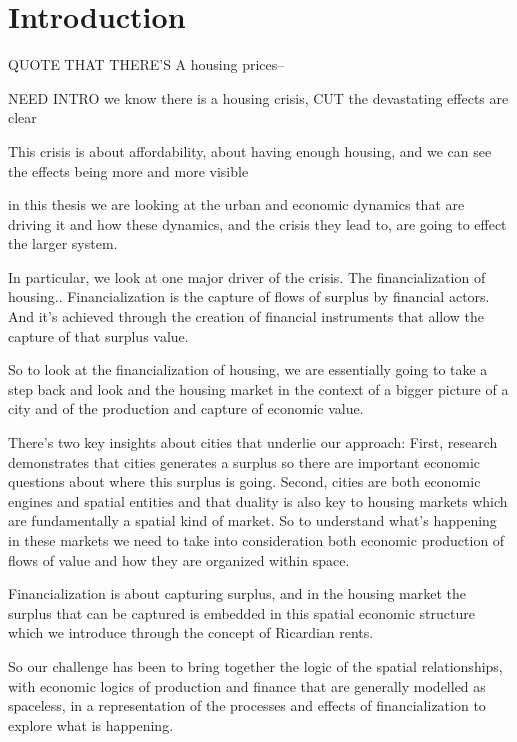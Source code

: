 
\section{Introduction}
QUOTE THAT THERE'S A housing prices--

NEED INTRO
we know there is a housing crisis, CUT  the devastating effects are clear 

This crisis is about affordability, about having enough housing, 
and we can see the effects being more and more visible %

in this thesis we are looking at the urban and economic dynamics that are driving it and how  these dynamics, and the  crisis they lead to, are going to effect the larger system.

In particular, we look at one major driver of the crisis. The financialization of housing.. 
Financialization is the capture of flows of surplus by financial actors. And it's achieved through the creation of financial instruments that allow the capture of that surplus value. 

So to look at the financialization of housing,  we are essentially going to take a step back %
and look and the housing market in the context of a bigger picture of a city and of the production and capture of economic value.

There's two key insights about cities that underlie our approach: 
First, research demonstrates that cities  generates a surplus so there are important economic questions about where this surplus is going. 
Second, cities are both economic engines and spatial entities and that duality is also key to housing markets which are fundamentally a spatial kind of market. So to understand what's happening in these markets we need to take into consideration both economic production of flows of value and how they are organized within space. 

Financialization %
is about capturing surplus, and %
in the housing market the surplus that can be captured is embedded in this spatial economic structure which we introduce through the concept of Ricardian rents. 

So our challenge has been to bring together the logic of the spatial relationships,  with economic logics of production and finance that are generally modelled as spaceless,  in a representation of the processes and effects of  financialization to explore  what is happening.

